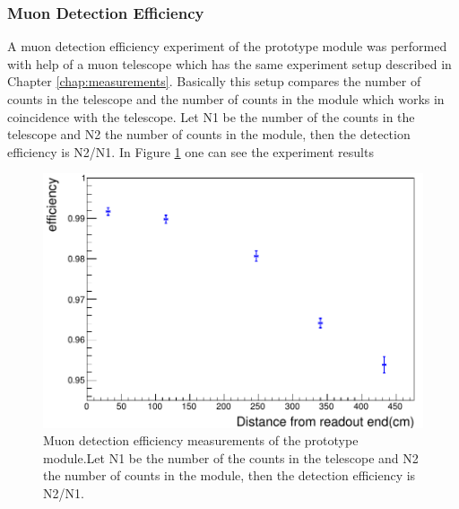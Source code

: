 \documentclass[a4paper]{article}\linespread{1.4}
\begin{document}
\subsubsection{Muon Detection Efficiency}
A muon detection efficiency experiment of the prototype module was performed with help of a muon telescope which has the same experiment setup described in Chapter \ref{chap:measurements}. Basically this setup compares the number of counts in the telescope and the number of counts in the module which works in coincidence with the telescope. Let N1 be the number of the counts in the telescope and N2 the number of counts in the module,  then the detection efficiency is N2/N1.
In Figure \ref{fig:eff} one can see the experiment results \begin{figure}[h!] \centering \includegraphics[width=120mm,scale=1.0]{eff.png} \caption{Muon detection efficiency measurements of the prototype module.Let N1 be the number of the counts in the telescope and N2 the number of counts in the module,  then the detection efficiency is N2/N1. \cite{E}} \label{fig:eff}\end{figure} 
\end{document}
